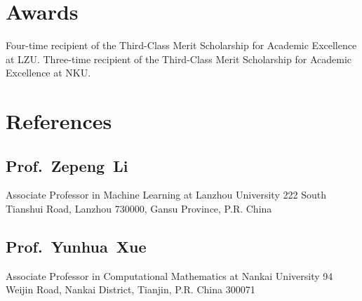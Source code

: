 \documentclass[11pt,a4paper, final]{moderncv}
\newcommand{\spacesubsection}{\vspace{0.2cm}}
\begin{document}
\section{\textbf{Awards}}
		{Four-time recipient of the Third-Class Merit Scholarship for Academic Excellence at LZU.}
		{Three-time recipient of the Third-Class Merit Scholarship for Academic Excellence at NKU.}
\section{\textbf{References}}
	\subsection{Prof.~Zepeng~Li}
		\cvline{}
		{Associate Professor in Machine Learning at Lanzhou University}
		{222 South Tianshui Road, Lanzhou 730000, Gansu Province, P.R. China}
	\subsection{Prof.~Yunhua~Xue}
		\cvline{}
		{Associate Professor in Computational Mathematics at Nankai University}
		{94 Weijin Road, Nankai District, Tianjin, P.R. China 300071}
\end{document}
